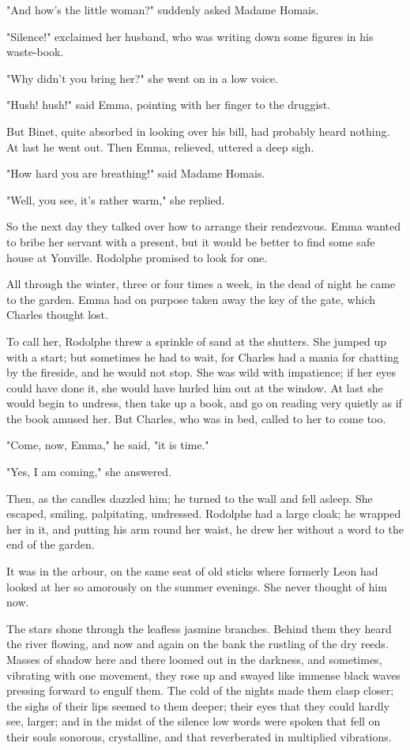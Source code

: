 \documentclass{tufte-book}
\begin{document}
"And how's the little woman?" suddenly asked Madame Homais.

"Silence!" exclaimed her husband, who was writing down some figures in
his waste-book.

"Why didn't you bring her?" she went on in a low voice.

"Hush! hush!" said Emma, pointing with her finger to the druggist.

But Binet, quite absorbed in looking over his bill, had probably heard
nothing. At last he went out. Then Emma, relieved, uttered a deep sigh.

"How hard you are breathing!" said Madame Homais.

"Well, you see, it's rather warm," she replied.

So the next day they talked over how to arrange their rendezvous. Emma
wanted to bribe her servant with a present, but it would be better to
find some safe house at Yonville. Rodolphe promised to look for one.

All through the winter, three or four times a week, in the dead of night
he came to the garden. Emma had on purpose taken away the key of the
gate, which Charles thought lost.

To call her, Rodolphe threw a sprinkle of sand at the shutters. She
jumped up with a start; but sometimes he had to wait, for Charles had a
mania for chatting by the fireside, and he would not stop. She was wild
with impatience; if her eyes could have done it, she would have hurled
him out at the window. At last she would begin to undress, then take up
a book, and go on reading very quietly as if the book amused her. But
Charles, who was in bed, called to her to come too.

"Come, now, Emma," he said, "it is time."

"Yes, I am coming," she answered.

Then, as the candles dazzled him; he turned to the wall and fell asleep.
She escaped, smiling, palpitating, undressed. Rodolphe had a large
cloak; he wrapped her in it, and putting his arm round her waist, he
drew her without a word to the end of the garden.

It was in the arbour, on the same seat of old sticks where formerly Leon
had looked at her so amorously on the summer evenings. She never thought
of him now.

The stars shone through the leafless jasmine branches. Behind them they
heard the river flowing, and now and again on the bank the rustling
of the dry reeds. Masses of shadow here and there loomed out in the
darkness, and sometimes, vibrating with one movement, they rose up and
swayed like immense black waves pressing forward to engulf them. The
cold of the nights made them clasp closer; the sighs of their lips
seemed to them deeper; their eyes that they could hardly see, larger;
and in the midst of the silence low words were spoken that fell on
their souls sonorous, crystalline, and that reverberated in multiplied
vibrations.
\end{document}
